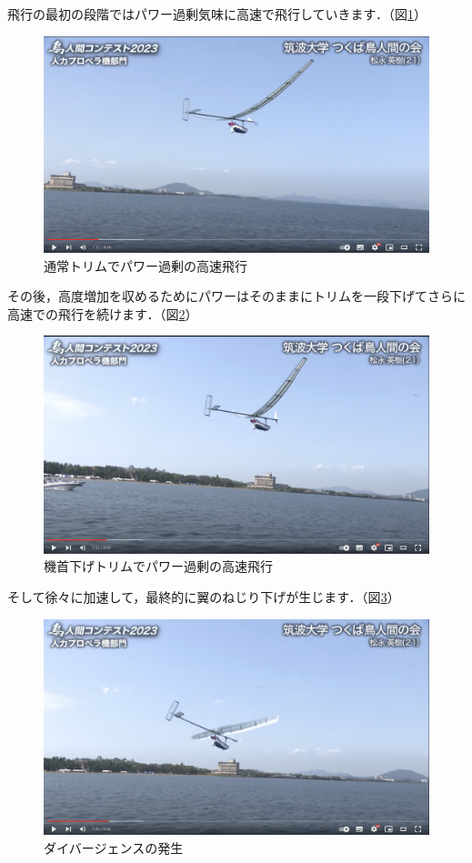 \documentclass{jarticle}
\begin{document}
飛行の最初の段階ではパワー過剰気味に高速で飛行していきます．（図\ref{tsukuba1}）
\begin{figure}[H]
    \centering
    \includegraphics[width=0.7\linewidth]{image/tsukuba0111.png}
    \caption{通常トリムでパワー過剰の高速飛行}
    \label{tsukuba1}
\end{figure}
その後，高度増加を収めるためにパワーはそのままにトリムを一段下げてさらに高速での飛行を続けます．（図\ref{tsukuba2}）
\begin{figure}[H]
    \centering
    \includegraphics[width=0.7\linewidth]{image/tsukuba0122.png}
    \caption{機首下げトリムでパワー過剰の高速飛行}
    \label{tsukuba2}
\end{figure}
そして徐々に加速して，最終的に翼のねじり下げが生じます．（図\ref{tsukuba3}）
\begin{figure}[H]
    \centering
    \includegraphics[width=0.7\linewidth]{image/tsukuba0126.png}
    \caption{ダイバージェンスの発生}
    \label{tsukuba3}
\end{figure}
\end{document}
